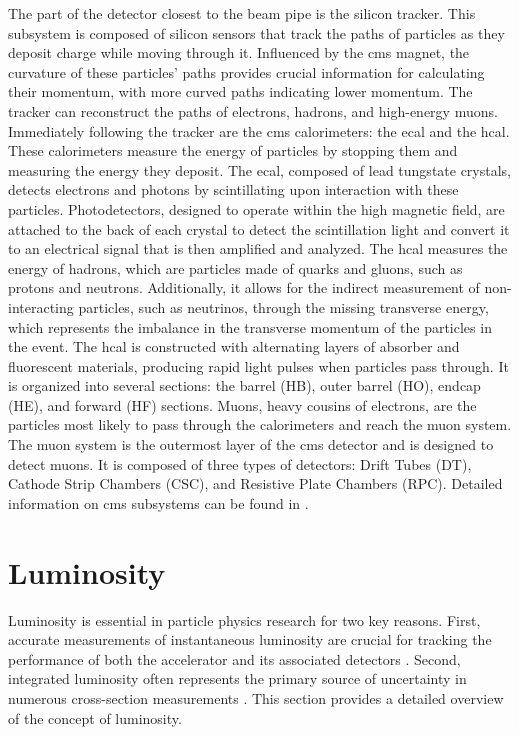 The part of the detector closest to the beam pipe is the silicon tracker. This subsystem is composed of silicon sensors that track the paths of particles as they deposit charge while moving through it. Influenced by the \acrshort{cms} magnet, the curvature of these particles' paths provides crucial information for calculating their momentum, with more curved paths indicating lower momentum. The tracker can reconstruct the paths of electrons, hadrons, and high-energy muons. Immediately following the tracker are the \acrshort{cms} calorimeters: the \acrfull{ecal} and the \acrfull{hcal}. These calorimeters measure the energy of particles by stopping them and measuring the energy they deposit. The \acrshort{ecal}, composed of lead tungstate crystals, detects electrons and photons by scintillating upon interaction with these particles. Photodetectors, designed to operate within the high magnetic field, are attached to the back of each crystal to detect the scintillation light and convert it to an electrical signal that is then amplified and analyzed. The \acrshort{hcal} measures the energy of hadrons, which are particles made of quarks and gluons, such as protons and neutrons. Additionally, it allows for the indirect measurement of non-interacting particles, such as neutrinos, through the missing transverse energy, which represents the imbalance in the transverse momentum of the particles in the event. The \acrshort{hcal} is constructed with alternating layers of absorber and fluorescent materials, producing rapid light pulses when particles pass through. It is organized into several sections: the barrel (HB), outer barrel (HO), endcap (HE), and forward (HF) sections. Muons, heavy cousins of electrons, are the particles most likely to pass through the calorimeters and reach the muon system. The muon system is the outermost layer of the \acrshort{cms} detector and is designed to detect muons. It is composed of three types of detectors: Drift Tubes (DT), Cathode Strip Chambers (CSC), and Resistive Plate Chambers (RPC). Detailed information on \acrshort{cms} subsystems can be found in \cite{CERN-LHCC-2020-004}.

\section{Luminosity}
\label{sec:luminosity}

Luminosity is essential in particle physics research for two key reasons. First, accurate measurements of instantaneous luminosity are crucial for tracking the performance of both the accelerator and its associated detectors \cite{PhysRevAccelBeams.21.102801}. Second, integrated luminosity often represents the primary source of uncertainty in numerous cross-section measurements \cite{cms2022measurement, sirunyan2019measurement}. This section provides a detailed overview of the concept of luminosity.

